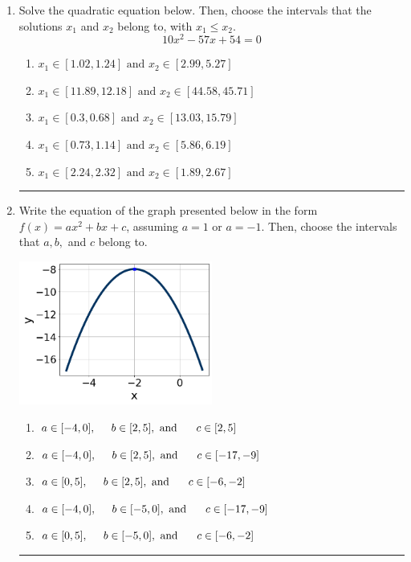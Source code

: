 \documentclass[14pt]{extbook}
\newcommand{\litem}[1]{\item#1\hspace*{-1cm}\rule{\textwidth}{0.4pt}}
\begin{document}
\begin{enumerate}
{\begin{enumerate}[label=\Alph*.]
\end{enumerate} }
\litem{
Solve the quadratic equation below. Then, choose the intervals that the solutions $x_1$ and $x_2$ belong to, with $x_1 \leq x_2$.\[ 10x^{2} -57 x + 54 = 0 \]\begin{enumerate}[label=\Alph*.]
\item \( x_1 \in [1.02, 1.24] \text{ and } x_2 \in [2.99, 5.27] \)
\item \( x_1 \in [11.89, 12.18] \text{ and } x_2 \in [44.58, 45.71] \)
\item \( x_1 \in [0.3, 0.68] \text{ and } x_2 \in [13.03, 15.79] \)
\item \( x_1 \in [0.73, 1.14] \text{ and } x_2 \in [5.86, 6.19] \)
\item \( x_1 \in [2.24, 2.32] \text{ and } x_2 \in [1.89, 2.67] \)

\end{enumerate} }
\litem{
Write the equation of the graph presented below in the form $f(x)=ax^2+bx+c$, assuming  $a=1$ or $a=-1$. Then, choose the intervals that $a, b,$ and $c$ belong to.
\begin{center}
    \includegraphics[width=0.5\textwidth]{../Figures/quadraticGraphToEquationCopyB.png}
\end{center}
\begin{enumerate}[label=\Alph*.]
\item \( a \in [-4, 0], \hspace*{5mm} b \in [2, 5], \text{ and } \hspace*{5mm} c \in [2, 5] \)
\item \( a \in [-4, 0], \hspace*{5mm} b \in [2, 5], \text{ and } \hspace*{5mm} c \in [-17, -9] \)
\item \( a \in [0, 5], \hspace*{5mm} b \in [2, 5], \text{ and } \hspace*{5mm} c \in [-6, -2] \)
\item \( a \in [-4, 0], \hspace*{5mm} b \in [-5, 0], \text{ and } \hspace*{5mm} c \in [-17, -9] \)
\item \( a \in [0, 5], \hspace*{5mm} b \in [-5, 0], \text{ and } \hspace*{5mm} c \in [-6, -2] \)


\end{enumerate}}
\end{enumerate}
\end{document}
